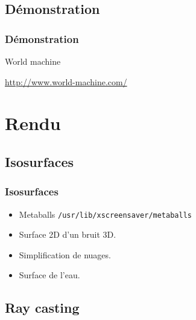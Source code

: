 \documentclass[hyperref={pdfpagelabels=false}]{beamer}
\begin{document}
\subsection{Démonstration}
\begin{frame}
  \frametitle{Démonstration}
  \begin{center}
  {\Huge World machine}
  
  \vspace{1em}
  \url{http://www.world-machine.com/}
  \end{center}
\end{frame}

\section{Rendu}

\subsection{Isosurfaces}
\begin{frame}
  \frametitle{Isosurfaces}
  \begin{itemize}
    \item Metaballs {\small \texttt{/usr/lib/xscreensaver/metaballs}}
    \item Surface 2D d'un bruit 3D.
    \item Simplification de nuages.
    \item Surface de l'eau.
  \end{itemize}
\end{frame}

\subsection{Ray casting}
\end{document}
